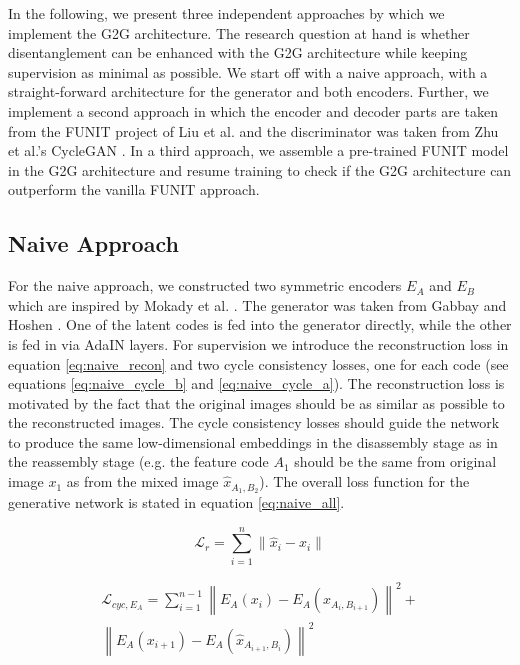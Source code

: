 \documentclass[conference]{IEEEtran}
\begin{document}
In the following, we present three independent approaches by which we implement the G2G architecture. The research question at hand is whether disentanglement can be enhanced with the G2G architecture while keeping supervision as minimal as possible.
We start off with a naive approach, with a straight-forward architecture for the generator and both encoders. 
Further, we implement a second approach in which the encoder and decoder parts are taken from the FUNIT project of Liu et al. and the discriminator was taken from Zhu et al.'s CycleGAN \cite{zhu2017unpaired}.
In a third approach, we assemble a pre-trained FUNIT model in the G2G architecture and resume training to check if the G2G architecture can outperform the vanilla FUNIT approach.

\subsection{Naive Approach}

For the naive approach, we constructed two symmetric encoders $E_A$ and $E_B$ which are inspired by Mokady et al. \cite{mokady2019mask}. The generator was taken from Gabbay and Hoshen \cite{gabbay2019demystifying}. One of the latent codes is fed into the generator directly, while the other is fed in via AdaIN layers. For supervision we introduce the reconstruction loss in equation \ref{eq:naive_recon} and two cycle consistency losses, one for each code (see equations \ref{eq:naive_cycle_b} and \ref{eq:naive_cycle_a}). The reconstruction loss is motivated by the fact that the original images should be as similar as possible to the reconstructed images. The cycle consistency losses should guide the network to produce the same low-dimensional embeddings in the disassembly stage as in the reassembly stage (e.g. the feature code $A_1$ should be the same from original image $x_1$ as from the mixed image $\hat{x}_{A_1, B_2}$). The overall loss function for the generative network is stated in equation \ref{eq:naive_all}.

\begin{equation}
	\mathcal{L}_{r} = \sum_{i=1}^{n} \left\| \hat{x}_i - x_i \right\| 
	\label{eq:naive_recon}
\end{equation}

\begin{equation}
\begin{split}
\mathcal{L}_{cyc, E_A} = \sum_{i=1}^{n-1} 
\left\| E_A(x_i) - E_A(\hat{x}_{A_i,B_{i+1}}) \right\|^2 + \\
\left\| E_A(x_{i+1}) - E_A(\hat{x}_{A_{i+1},B_i})
\right\|^2
\label{eq:naive_cycle_a}
\end{split}
\end{equation}
\end{document}
